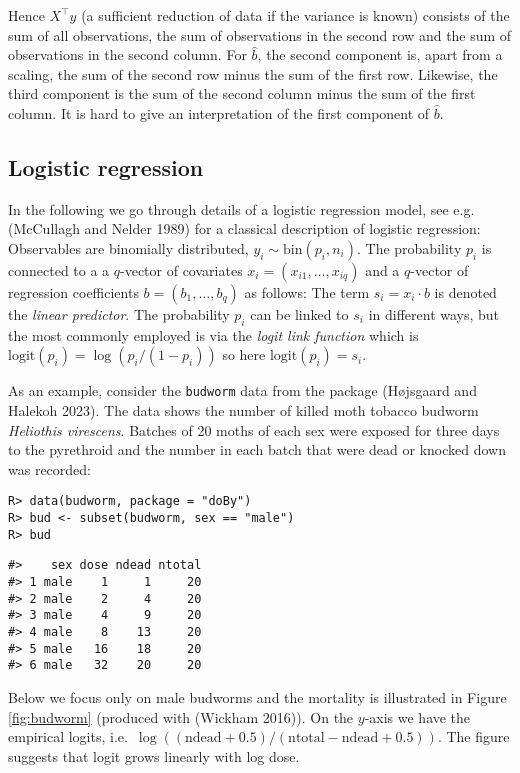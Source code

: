 Hence \(X^\top y\) (a sufficient reduction of data if the variance is known)
consists of the sum of all observations, the sum of
observations in the second row and the sum of observations in the second column. For \(\hat{b}\), the second component is, apart from a scaling, the sum of the second row minus the sum of the first row. Likewise, the third component is the sum of the second column minus the sum of the first column. It is hard to give an interpretation of the first component of \(\hat{b}\).

\hypertarget{logistic-regression}{%
\subsection{Logistic regression}\label{logistic-regression}}

In the following we go through details of a logistic regression model,
see e.g. (McCullagh and Nelder 1989) for a classical description of logistic
regression: Observables are binomially distributed, \(y_i \sim \text{bin}(p_i, n_i)\). The probability \(p_i\) is connected to a a
\(q\)-vector of covariates \(x_i=(x_{i1}, \dots, x_{iq})\) and a
\(q\)-vector of regression coefficients \(b=(b_1, \dots, b_q)\) as
follows: The term \(s_i = x_i \cdot b\) is denoted the \emph{linear
predictor}. The probability \(p_i\) can be linked to \(s_i\) in different
ways, but the most commonly employed is via the \emph{logit link
function} which is \(\text{logit}(p_i) = \log(p_i/(1-p_i))\) so here
\(\text{logit}(p_i) = s_i\).

As an example, consider the \texttt{budworm} data from the  package (Højsgaard and Halekoh 2023).
The data shows the number of killed moth tobacco budworm
\emph{Heliothis virescens}. Batches of 20 moths of each sex were
exposed for three days to the pyrethroid and the number in each batch
that were dead or knocked down was recorded:

\begin{verbatim}
R> data(budworm, package = "doBy")
R> bud <- subset(budworm, sex == "male")
R> bud
\end{verbatim}

\begin{verbatim}
#>    sex dose ndead ntotal
#> 1 male    1     1     20
#> 2 male    2     4     20
#> 3 male    4     9     20
#> 4 male    8    13     20
#> 5 male   16    18     20
#> 6 male   32    20     20
\end{verbatim}

Below we focus only on male budworms and the mortality is illustrated
in Figure \ref{fig:budworm} (produced with  (Wickham 2016)). On the \(y\)-axis we have the empirical
logits, i.e.~\(\log((\text{ndead} + 0.5)/(\text{ntotal}-\text{ndead} + 0.5))\). The figure suggests that logit grows linearly with log dose.

